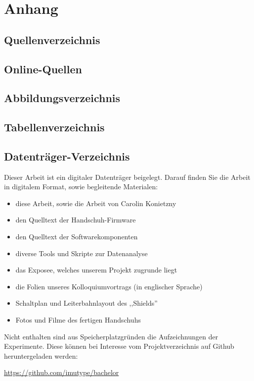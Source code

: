 \chapter{Anhang}

\section{Quellenverzeichnis}
\printbibliography[nottype=online,heading=none,title=none]

\section{Online-Quellen}
\newrefcontext[sorting=none]
\printbibliography[type=online,heading=none,title=none,env=bibliographyNUM,resetnumbers]

\section{Abbildungsverzeichnis}
\makeatletter
{}
\makeatother

\section{Tabellenverzeichnis}
\makeatletter
{}
\makeatother

\section{Datenträger-Verzeichnis}
Dieser Arbeit ist ein digitaler Datenträger beigelegt. Darauf finden Sie die
Arbeit in digitalem Format, sowie begleitende Materialen:

\begin{itemize}[noitemsep]
    \item diese Arbeit, sowie die Arbeit von Carolin Konietzny
    \item den Quelltext der Handschuh-Firmware
    \item den Quelltext der Softwarekomponenten
    \item diverse Tools und Skripte zur Datenanalyse
    \item das Exposee, welches unserem Projekt zugrunde liegt
    \item die Folien unseres Kolloquiumvortrags (in englischer Sprache)
    \item Schaltplan und Leiterbahnlayout des ,,Shields''
    \item Fotos und Filme des fertigen Handschuhs
\end{itemize}

Nicht enthalten sind aus Speicherplatzgründen die Aufzeichnungen der
Experimente. Diese können bei Interesse vom Projektverzeichnis auf Github
heruntergeladen werden:

\begin{center}
    \url{https://github.com/imutype/bachelor}
\end{center}

